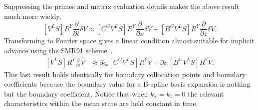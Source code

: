 Suppressing the primes and matrix evaluation details makes the above result
much more wieldy,
\[
\label{eq:dimeulertransformcharnotYphys}
  \left[V^L S\right]
  R^Y
  \frac{\partial}{\partial{}t}
  \delta{}V
\approx
  \left[C^G V^L S\right]
  R^Y
  \frac{\partial}{\partial{}x}
  \delta{}V
  +
  \left[B^G V^L S\right]
  R^Y
  \frac{\partial}{\partial{}z}
  \delta{}V
.
\]
Transforming to Fourier space gives a linear condition almost suitable
for implicit advance using the SMR91
scheme~\cite{spalart_lowstoragerk, Ulerich_SZPerfect}.
\begin{align}
\label{eq:dimeulertransformcharnotYwave}
  \left[V^L S\right]
  R^Y
  \frac{\partial}{\partial{}t}
  \hat{V}
&\approx
  \ii k_x
  \left[C^G V^L S\right]
  R^Y
  \hat{V}
  +
  \ii k_z
  \left[B^G V^L S\right]
  R^Y
  \hat{V}
.
\end{align}
This last result holds identically for boundary collocation points and boundary
coefficients because the boundary value for a B-spline basis expansion is
nothing but the boundary coefficient.  Notice that when $k_x=k_z=0$ the
relevant characteristics within the mean state are held constant in time.

